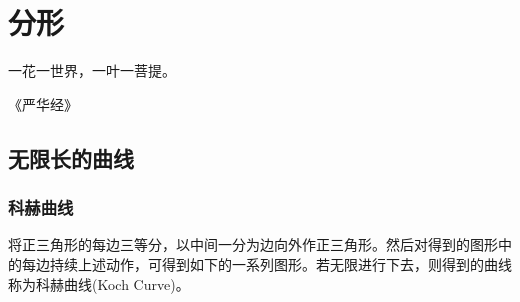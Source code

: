 \chapter{分形}
\label{chap:fractal}

\epigraph{一花一世界，一叶一菩提。}{《严华经》}

\section{无限长的曲线}
\label{sec:curve-with-infinite-length}

\subsection{科赫曲线}
\label{sec:Koch-curve}

将正三角形的每边三等分，以中间一分为边向外作正三角形。然后对得到的图形中的每边持续上述动作，可得到如下的一系列图形。若无限进行下去，则得到的曲线称为科赫曲线(Koch Curve)。

\def\kochsnowflake[#1,#2,#3]{%
  \coordinate(N1#1)at($2/3*(#2)+1/3*(#3)$);
  \coordinate(N2#1)at($1/3*(#2)+2/3*(#3)$);
  \coordinate(N3#1)at($(N2#1)!1!60:(N1#1)$);
  \ifnum#1=1
  \draw(#2)--(N1#1)--(N3#1)--(N2#1)--(#3);
  \else
  \ifnum#1=2
  \kochsnowflake[1,#2,  N1#1]
  \kochsnowflake[1,N1#1,N3#1]
  \kochsnowflake[1,N3#1,N2#1]
  \kochsnowflake[1,N2#1,#3]
  \else\ifnum#1=3
  \kochsnowflake[2,#2,  N1#1]
  \kochsnowflake[2,N1#1,N3#1]
  \kochsnowflake[2,N3#1,N2#1]
  \kochsnowflake[2,N2#1,#3]
  \else\ifnum#1=4
  \kochsnowflake[3,#2,  N1#1]
  \kochsnowflake[3,N1#1,N3#1]
  \kochsnowflake[3,N3#1,N2#1]
  \kochsnowflake[3,N2#1,#3]
  \else\ifnum#1=5
  \kochsnowflake[4,#2,  N1#1]
  \kochsnowflake[4,N1#1,N3#1]
  \kochsnowflake[4,N3#1,N2#1]
  \kochsnowflake[4,N2#1,#3]
  \else\ifnum#1=6
  \kochsnowflake[5,#2,  N1#1]
  \kochsnowflake[5,N1#1,N3#1]
  \kochsnowflake[5,N3#1,N2#1]
  \kochsnowflake[5,N2#1,#3]
  \fi\fi\fi\fi\fi
  \fi
}


